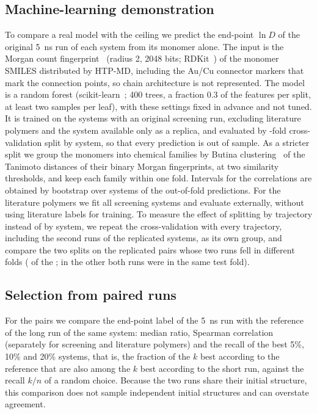 \documentclass[preprint,12pt]{elsarticle}
\begin{document}
\subsection{Machine-learning demonstration}\label{sec:ml-method}
To compare a real model with the ceiling we predict the end-point $\ln D$ of the original
\SI{5}{\nano\second} run of each system from its monomer alone. The input is the Morgan count
fingerprint~\cite{Rogers2010ECFP} (radius 2, 2048 bits; RDKit~\cite{RDKit}) of the monomer SMILES distributed by HTP-MD, including
the Au/Cu connector markers that mark the connection points, so chain architecture is not represented. The
model is a random forest (scikit-learn~\cite{Pedregosa2011Scikit}; 400 trees, a fraction 0.3 of the features per split, at
least two samples per leaf), with these settings fixed in advance and not tuned. It is trained on
the \mlNSys{} systems with an original screening run, excluding literature polymers
and the \nOnlyReplica{} system available only as a replica, and evaluated by
\mlFolds-fold cross-validation split by system, so that every prediction is out of sample. As a
stricter split we group the monomers into chemical families by Butina clustering~\cite{Butina1999Clustering} of the Tanimoto
distances of their binary Morgan fingerprints, at two similarity thresholds, and keep each family
within one fold. Intervals for the correlations are obtained by bootstrap over systems of the
out-of-fold predictions. For the literature polymers we fit all screening systems and evaluate
externally, without using literature labels for training. To measure the effect of splitting by trajectory instead of by system,
we repeat the cross-validation with every trajectory, including the second runs of the replicated
systems, as its own group, and compare the two splits on the replicated pairs whose two runs fell
in different folds (\mlLeakPairs{} of the \nRep{}; in the other \mlLeakSameFold{} both runs were
in the same test fold).

\subsection{Selection from paired runs}\label{sec:selection-method}
For the \nPairs{} pairs we compare the end-point label of the \SI{5}{\nano\second} run with the
reference of the long run of the same system: median ratio, Spearman correlation (separately for
screening and literature polymers) and the recall of the best 5\%, 10\% and 20\% systems, that is,
the fraction of the $k$ best according to the reference that are also among the $k$ best according
to the short run, against the recall $k/n$ of a random choice. Because the two runs share their
initial structure, this comparison does not sample independent initial structures and can overstate agreement.
\end{document}
